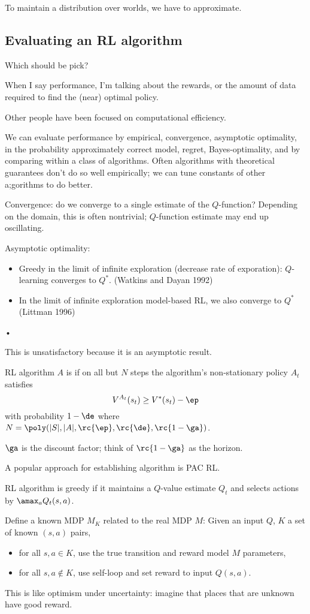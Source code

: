 To maintain a distribution over worlds, we have to approximate. %

\subsection{Evaluating an RL algorithm}

Which should be pick?

When  I say performance, I'm talking about the rewards, or the amount of data required to find the (near) optimal policy.

Other people have been focused on computational efficiency.

We can evaluate performance by empirical, convergence, asymptotic optimality, in the probability approximately correct model, regret, Bayes-optimality, and by comparing within a class of algorithms. Often algorithms with theoretical guarantees don't do so well empirically; we can tune constants of other a;gorithms to  do better. 

Convergence: do we converge to a single estimate of the $Q$-function? %
Depending on the domain, this is often nontrivial; $Q$-function estimate may end up oscillating.

Asymptotic optimality: 
\begin{itemize}
\item
Greedy in the limit of infinite exploration (decrease rate of exporation): $Q$-learning converges to $Q^*$. (Watkins and Dayan 1992)
\item
In the limit of infinite exploration model-based RL, we also converge to $Q^*$ (Littman 1996)
\end{itemize}•

This is unsatisfactory because it is an asymptotic result.

\begin{df}
RL algorithm $A$ is  if on all but $N$ steps the algorithm's non-stationary policy $A_t$ satisfies 
$$
V^{A_t}(s_t) \ge V^*(s_t)-\ep
$$
with probability $1-\de$ where $N=\poly(|S|,|A|, \rc{\ep}, \rc{\de}, \rc{1-\ga})$.
\end{df}
$\ga$ is the discount factor; think of $\rc{1-\ga}$ as the horizon.

A popular approach for establishing algorithm is PAC RL. 

RL algorithm is greedy if it maintains a $Q$-value estimate $Q_t$ and selects actions by $\amax_aQ_t(s,a)$. 

Define a known MDP $M_K$ related to the real MDP $M$:
Given an input $Q$, $K$ a set of known $(s,a)$ pairs, 
\begin{itemize}
\item
for all $s,a\in K$, use the true transition and reward model $M$ parameters, 
\item
for all $s,a\nin K$, use self-loop and set reward to input $Q(s,a)$.
\end{itemize}
This is like optimism under uncertainty: imagine that places that are unknown have good reward.

